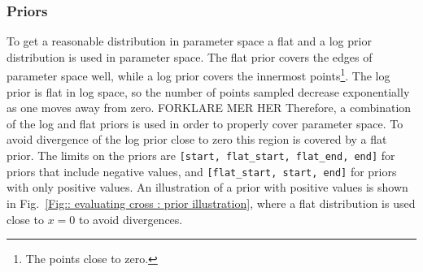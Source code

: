 \documentclass[twoside,english]{uiofysmaster}
\begin{document}
{\subsubsection{Priors}





To get a reasonable distribution in parameter space a flat and a log prior distribution is used in parameter space. The flat prior covers the edges of parameter space well, while a log prior covers the innermost points\footnote{The points close to zero.}. The log prior is flat in log space, so the number of points sampled decrease exponentially as one moves away from zero. 	FORKLARE MER HER Therefore, a combination of the log and flat priors is used in order to properly cover parameter space. To avoid divergence of the log prior close to zero this region is covered by a flat prior. The limits on the priors are \verb|[start, flat_start, flat_end, end]| for priors that include negative values, and \verb|[flat_start, start, end]| for priors with only positive values. An illustration of a prior with positive values is shown in Fig.~\ref{Fig:: evaluating cross : prior illustration}, where a flat distribution is used close to $x=0$ to avoid divergences.

}
\end{document}
